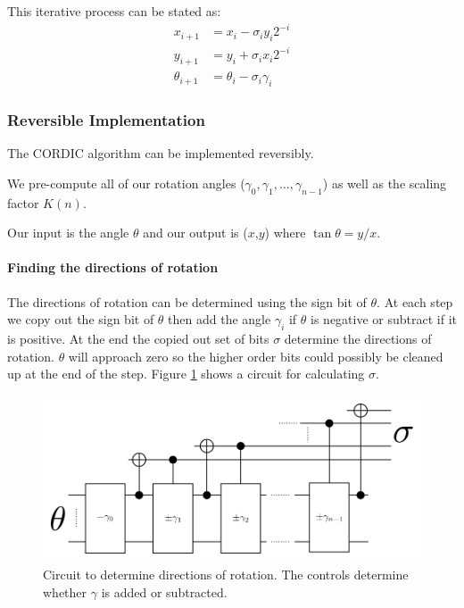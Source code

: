         This iterative process can be stated as:
        \begin{equation}\label{eq:cordIter}
            \begin{aligned}
                x_{i+1}      &= x_i - \sigma_iy_i2^{-i}\\
                y_{i+1}      &= y_i + \sigma_ix_i2^{-i}\\
                \theta_{i+1} &= \theta_i - \sigma_i\gamma_i
            \end{aligned}
        \end{equation}

    \subsubsection{Reversible Implementation}
        The CORDIC algorithm can be implemented reversibly.

        We pre-compute all of our rotation angles ($\gamma_0,\gamma_1,\dotsc,\gamma_{n-1}$) as well as the scaling factor $K(n)$.

        Our input is the angle $\theta$ and our output is ($x$,$y$) where $\tan\theta = y/x$.

        \paragraph{Finding the directions of rotation}
            The directions of rotation can be determined using the sign bit of $\theta$.
            At each step we copy out the sign bit of $\theta$ then add the angle $\gamma_i$ if $\theta$ is negative or subtract if it is positive.
            At the end the copied out set of bits $\sigma$ determine the directions of rotation.
            $\theta$ will approach zero so the higher order bits could possibly be cleaned up at the end of the step.
            Figure \ref{fig:CORDICDirections} shows a circuit for calculating $\sigma$.
            \begin{figure}
                \capstart
                \centering
                \includegraphics[width=\textwidth]{images/CORDICDirections}
                \caption{Circuit to determine directions of rotation.  The controls determine whether $\gamma$ is added or subtracted.}
                \label{fig:CORDICDirections}
            \end{figure}

